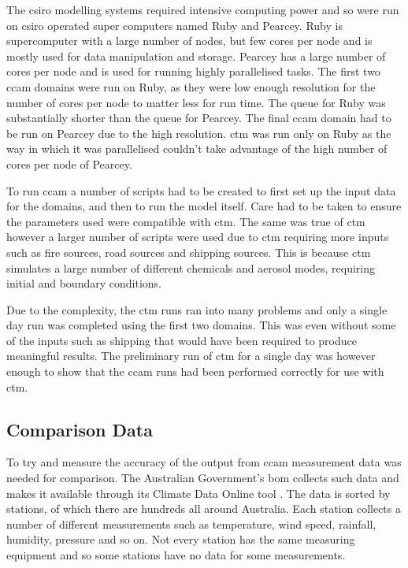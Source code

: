 The \gls{csiro} modelling systems required intensive computing power and so were run on \gls{csiro} operated super computers named Ruby and Pearcey. Ruby is supercomputer with a large number of nodes, but few cores per node and is mostly used for data manipulation and storage. Pearcey has a large number of cores per node and is used for running highly parallelised tasks. The first two \gls{ccam} domains were run on Ruby, as they were low enough resolution for the number of cores per node to matter less for run time. The queue for Ruby was substantially shorter than the queue for Pearcey. The final \gls{ccam} domain had to be run on Pearcey due to the high resolution. \gls{ctm} was run only on Ruby as the way in which it was parallelised couldn't take advantage of the high number of cores per node of Pearcey.  

To run \gls{ccam} a number of scripts had to be created to first set up the input data for the domains, and then to run the model itself. Care had to be taken to ensure the parameters used were compatible with \gls{ctm}. The same was true of \gls{ctm} however a larger number of scripts were used due to \gls{ctm} requiring more inputs such as fire sources, road sources and shipping sources. This is because \gls{ctm} simulates a large number of different chemicals and aerosol modes, requiring initial and boundary conditions. 

Due to the complexity, the \gls{ctm} runs ran into many problems and only a single day run was completed using the first two domains. This was even without some of the inputs such as shipping that would have been required to produce meaningful results. The preliminary run of \gls{ctm} for a single day was however enough to show that the \gls{ccam} runs had been performed correctly for use with \gls{ctm}.

\subsection{Comparison Data}
\label{subsec:domains}

To try and measure the accuracy of the output from \gls{ccam} measurement data was needed for comparison. The Australian Government's \gls{bom} collects such data and makes it available through its Climate Data Online tool \citep{bom}. The data is sorted by stations, of which there are hundreds all around Australia. Each station collects a number of different measurements such as temperature, wind speed, rainfall, humidity, pressure and so on. Not every station has the same measuring equipment and so some stations have no data for some measurements.


